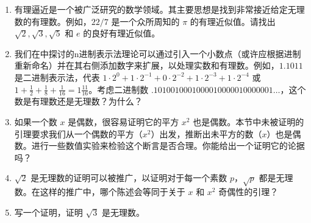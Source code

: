 \begin{enumerate}

    \item 
    
    有理逼近是一个被广泛研究的数学领域。其主要思想是找到非常接近给定无理数的有理数。例如，$22/7$ 是一个众所周知的 $\pi$ 的有理近似值。请找出 $\sqrt{2}, \sqrt{3}, \sqrt{5}$ 和 $e$ 的良好有理近似值。
    \vfill
    
    \wbvfill
    
    
    \vfill
    
    \item 
    
    我们在中探讨的n进制表示法理论可以通过引入一个小数点（或许应根据进制重新命名）并在其右侧添加数字来扩展，以处理实数和有理数。例如，$1.1011$ 是二进制表示法，代表 $1 \cdot 2^0 + 1 \cdot 2^{-1} + 0 \cdot 2^{-2} + 1\cdot 2^{-3} + 1\cdot 2^{-4}$ 或 $\displaystyle 1 + \frac{1}{2} + \frac{1}{8} + \frac{1}{16} = 1 \frac{11}{16}$。考虑二进制数 $.1010010001000010000010000001\ldots$，这个数是有理数还是无理数？为什么？
    \vfill
    
    
    \workbookpagebreak
    \hintspagebreak
    
    \item 
    
    如果一个数 $x$ 是偶数，很容易证明它的平方 $x^2$ 也是偶数。本节中未被证明的引理要求我们从一个偶数的平方（$x^2$）出发，推断出未平方的数（$x$）也是偶数。进行一些数值实验来检验这个断言是否合理。你能给出一个证明它的论据吗？
    \vfill
    
    
    \vfill
    
    \item 
    
    $\sqrt{2}$ 是无理数的证明可以被推广，以证明对于每一个素数 $p$，$\sqrt{p}$ 都是无理数。在这样的推广中，哪个陈述会等同于关于 $x$ 和 $x^2$ 奇偶性的引理？
    \vfill
    
    
    \vfill
    
    \workbookpagebreak
    
    \item 
    
    写一个证明，证明 $\sqrt{3}$ 是无理数。
    \vfill
    
    
    \vfill
    
    
    \end{enumerate}